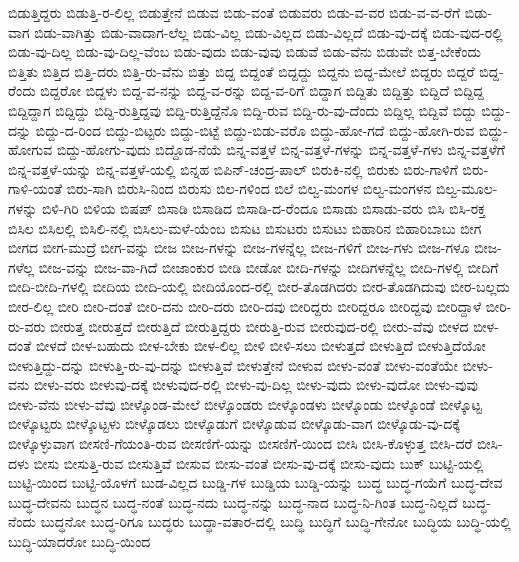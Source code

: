 {ಬಿಡುತ್ತಿದ್ದರು
ಬಿಡುತ್ತಿ-ರ-ಲಿಲ್ಲ
ಬಿಡುತ್ತೇನೆ
ಬಿಡುವ
ಬಿಡು-ವಂತೆ
ಬಿಡುವರು
ಬಿಡು-ವ-ವರ
ಬಿಡು-ವ-ವ-ರೆಗೆ
ಬಿಡು-ವಾಗ
ಬಿಡು-ವಾಗಿತ್ತು
ಬಿಡು-ವಾದಾಗ-ಲೆಲ್ಲ
ಬಿಡು-ವಿಲ್ಲ
ಬಿಡು-ವಿಲ್ಲದ
ಬಿಡು-ವಿಲ್ಲದೆ
ಬಿಡು-ವು-ದಕ್ಕೆ
ಬಿಡು-ವುದ-ರಲ್ಲಿ
ಬಿಡು-ವು-ದಿಲ್ಲ
ಬಿಡು-ವು-ದಿಲ್ಲ-ವೆಂಬ
ಬಿಡು-ವುದು
ಬಿಡು-ವುವು
ಬಿಡುವೆ
ಬಿಡು-ವೆನು
ಬಿಡುವೇ
ಬಿತ್ತ-ಬೇಕೆಂದು
ಬಿತ್ತಿತು
ಬಿತ್ತಿದ
ಬಿತ್ತಿ-ದರು
ಬಿತ್ತಿ-ರು-ವೆನು
ಬಿತ್ತು
ಬಿದ್ದ
ಬಿದ್ದಂತೆ
ಬಿದ್ದದ್ದು
ಬಿದ್ದನು
ಬಿದ್ದ-ಮೇಲೆ
ಬಿದ್ದರು
ಬಿದ್ದರೆ
ಬಿದ್ದ-ರೆಂದು
ಬಿದ್ದರೋ
ಬಿದ್ದಳು
ಬಿದ್ದ-ವ-ನನ್ನು
ಬಿದ್ದ-ವ-ರನ್ನು
ಬಿದ್ದ-ವ-ರಿಗೆ
ಬಿದ್ದಾಗ
ಬಿದ್ದಿತು
ಬಿದ್ದಿತ್ತು
ಬಿದ್ದಿದೆ
ಬಿದ್ದಿದ್ದ
ಬಿದ್ದಿದ್ದಾಗ
ಬಿದ್ದಿದ್ದು
ಬಿದ್ದಿ-ರುತ್ತಿದ್ದವು
ಬಿದ್ದಿ-ರುತ್ತಿದ್ದೆನೊ
ಬಿದ್ದಿ-ರುವ
ಬಿದ್ದಿ-ರು-ವು-ದೆಂದು
ಬಿದ್ದಿಲ್ಲ
ಬಿದ್ದಿವೆ
ಬಿದ್ದು
ಬಿದ್ದು-ದನ್ನು
ಬಿದ್ದು-ದ-ರಿಂದ
ಬಿದ್ದು-ಬಿಟ್ಟರು
ಬಿದ್ದು-ಬಿಟ್ಟೆ
ಬಿದ್ದು-ಬಿಡು-ವರೊ
ಬಿದ್ದು-ಹೋ-ಗದೆ
ಬಿದ್ದು-ಹೋಗಿ-ರುವ
ಬಿದ್ದು-ಹೋಗುವ
ಬಿದ್ದು-ಹೋಗು-ವುದು
ಬಿದ್ದೊಡ-ನೆಯೆ
ಬಿನ್ನ-ವತ್ತಳೆ
ಬಿನ್ನ-ವತ್ತಳೆ-ಗಳನ್ನು
ಬಿನ್ನ-ವತ್ತಳೆ-ಗಳು
ಬಿನ್ನ-ವತ್ತಳೆಗೆ
ಬಿನ್ನ-ವತ್ತಳೆ-ಯನ್ನು
ಬಿನ್ನ-ವತ್ತಳೆ-ಯಲ್ಲಿ
ಬಿನ್ನಹ
ಬಿಪಿನ್-ಚಂದ್ರ-ಪಾಲ್
ಬಿರುಕಿ-ನಲ್ಲಿ
ಬಿರುಕು
ಬಿರು-ಗಾಳಿಗೆ
ಬಿರು-ಗಾಳಿ-ಯಂತೆ
ಬಿರು-ಸಾಗಿ
ಬಿರುಸಿ-ನಿಂದ
ಬಿರುಸು
ಬಿಲ-ಗಳಿಂದ
ಬಿಲೆ
ಬಿಲ್ವ-ಮಂಗಳ
ಬಿಲ್ವ-ಮಂಗಳನ
ಬಿಲ್ವ-ಮೂಲ-ಗಳನ್ನು
ಬಿಳಿ-ಗಿರಿ
ಬಿಳಿಯ
ಬಿಷಪ್
ಬಿಸಾಡಿ
ಬಿಸಾಡಿದ
ಬಿಸಾಡಿ-ದ-ರೆಂದೂ
ಬಿಸಾಡು
ಬಿಸಾಡು-ವರು
ಬಿಸಿ
ಬಿಸಿ-ರಕ್ತ
ಬಿಸಿಲ
ಬಿಸಿಲಲ್ಲಿ
ಬಿಸಿಲಿ-ನಲ್ಲಿ
ಬಿಸಿಲು-ಮಳೆ-ಯೆಂಬ
ಬಿಸುಟ
ಬಿಸುಟರು
ಬಿಸುಟು
ಬಿಹಾರಿನ
ಬಿಹಾರಿಬಾಬು
ಬೀಗ
ಬೀಗದ
ಬೀಗ-ಮುದ್ರೆ
ಬೀಗ-ವನ್ನು
ಬೀಜ
ಬೀಜ-ಗಳನ್ನು
ಬೀಜ-ಗಳನ್ನೆಲ್ಲ
ಬೀಜ-ಗಳಿಗೆ
ಬೀಜ-ಗಳು
ಬೀಜ-ಗಳೂ
ಬೀಜ-ಗಳೆಲ್ಲ
ಬೀಜ-ವನ್ನು
ಬೀಜ-ವಾ-ಗಿದೆ
ಬೀಜಾಂಕುರ
ಬೀಡಿ
ಬೀಡೋ
ಬೀದಿ-ಗಳನ್ನು
ಬೀದಿಗಳನ್ನೆಲ್ಲ
ಬೀದಿ-ಗಳಲ್ಲಿ
ಬೀದಿಗೆ
ಬೀದಿ-ಬೀದಿ-ಗಳಲ್ಲಿ
ಬೀದಿಯ
ಬೀದಿ-ಯಲ್ಲಿ
ಬೀದಿಯೊಂದ-ರಲ್ಲಿ
ಬೀರ-ತೊಡಗಿದರು
ಬೀರ-ತೊಡಗಿದುವು
ಬೀರ-ಬಲ್ಲದು
ಬೀರ-ಲಿಲ್ಲ
ಬೀರಿ
ಬೀರಿ-ದಂತೆ
ಬೀರಿ-ದನು
ಬೀರಿ-ದರು
ಬೀರಿ-ದವು
ಬೀರಿದ್ದರು
ಬೀರಿದ್ದರೂ
ಬೀರಿದ್ದವು
ಬೀರಿದ್ದಾಳೆ
ಬೀರಿ-ರು-ವರು
ಬೀರುತ್ತ
ಬೀರುತ್ತದೆ
ಬೀರುತ್ತಿದೆ
ಬೀರುತ್ತಿದ್ದರು
ಬೀರುತ್ತಿ-ರುವ
ಬೀರುವುದ-ರಲ್ಲಿ
ಬೀರು-ವೆವು
ಬೀಳದ
ಬೀಳ-ದಂತೆ
ಬೀಳದೆ
ಬೀಳ-ಬಹುದು
ಬೀಳ-ಬೇಕು
ಬೀಳ-ಲಿಲ್ಲ
ಬೀಳಿ
ಬೀಳಿ-ಸಲು
ಬೀಳುತ್ತದೆ
ಬೀಳುತ್ತಿದೆ
ಬೀಳುತ್ತಿದೆಯೋ
ಬೀಳುತ್ತಿದ್ದು-ದನ್ನು
ಬೀಳುತ್ತಿ-ರು-ವು-ದನ್ನು
ಬೀಳುತ್ತಿವೆ
ಬೀಳುತ್ತೇನೆ
ಬೀಳುವ
ಬೀಳು-ವಂತೆ
ಬೀಳು-ವಂತೆಯೇ
ಬೀಳು-ವನು
ಬೀಳು-ವರು
ಬೀಳುವು-ದಕ್ಕೆ
ಬೀಳುವುದ-ರಲ್ಲಿ
ಬೀಳು-ವು-ದಿಲ್ಲ
ಬೀಳು-ವುದು
ಬೀಳು-ವುದೋ
ಬೀಳು-ವುವು
ಬೀಳು-ವೆನು
ಬೀಳು-ವೆವು
ಬೀಳ್ಕೊಂಡ-ಮೇಲೆ
ಬೀಳ್ಕೊಂಡರು
ಬೀಳ್ಕೊಂಡಳು
ಬೀಳ್ಕೊಂಡು
ಬೀಳ್ಕೊಂಡೆ
ಬೀಳ್ಕೊಟ್ಟ
ಬೀಳ್ಕೊಟ್ಟರು
ಬೀಳ್ಕೊಟ್ಟಳು
ಬೀಳ್ಕೊಡಲು
ಬೀಳ್ಕೊಡುಗೆ
ಬೀಳ್ಕೊಡುವ
ಬೀಳ್ಕೊಡು-ವಾಗ
ಬೀಳ್ಕೊಡು-ವು-ದಕ್ಕೆ
ಬೀಳ್ಕೊಳ್ಳುವಾಗ
ಬೀಸಣಿ-ಗೆಯಂತಿ-ರುವ
ಬೀಸಣಿಗೆ-ಯನ್ನು
ಬೀಸಣಿಗೆ-ಯಿಂದ
ಬೀಸಿ
ಬೀಸಿ-ಕೊಳ್ಳುತ್ತ
ಬೀಸಿ-ದರೆ
ಬೀಸಿ-ದಳು
ಬೀಸು
ಬೀಸುತ್ತಿ-ರುವ
ಬೀಸುತ್ತಿವೆ
ಬೀಸುವ
ಬೀಸು-ವಂತೆ
ಬೀಸು-ವು-ದಕ್ಕೆ
ಬೀಸು-ವುದು
ಬುಕ್
ಬುಟ್ಟಿ-ಯಲ್ಲಿ
ಬುಟ್ಟಿ-ಯಿಂದ
ಬುಟ್ಟಿ-ಯೊಳಗೆ
ಬುಡ-ವಿಲ್ಲದ
ಬುಡ್ಡಿ-ಗಳ
ಬುಡ್ಡಿಯ
ಬುಡ್ಡಿ-ಯನ್ನು
ಬುದ್ಧ
ಬುದ್ಧ-ಗಯೆಗೆ
ಬುದ್ಧ-ದೇವ
ಬುದ್ಧ-ದೇವನು
ಬುದ್ಧನ
ಬುದ್ಧ-ನಂತೆ
ಬುದ್ಧ-ನದು
ಬುದ್ಧ-ನನ್ನು
ಬುದ್ಧ-ನಾದ
ಬುದ್ಧ-ನಿ-ಗಿಂತ
ಬುದ್ಧ-ನಿಲ್ಲದೆ
ಬುದ್ಧ-ನೆಂದು
ಬುದ್ಧನೋ
ಬುದ್ಧ-ರಿಗೂ
ಬುದ್ಧರು
ಬುದ್ಧಾ-ವತಾರ-ದಲ್ಲಿ
ಬುದ್ಧಿ
ಬುದ್ಧಿಗೆ
ಬುದ್ಧಿ-ಗೇನೋ
ಬುದ್ಧಿಯ
ಬುದ್ಧಿ-ಯಲ್ಲಿ
ಬುದ್ಧಿ-ಯಾದರೋ
ಬುದ್ಧಿ-ಯಿಂದ
}
